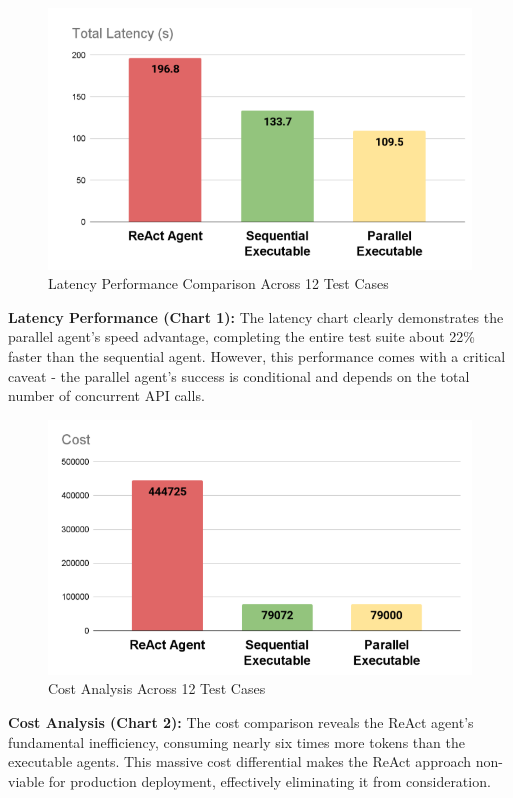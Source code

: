 \begin{spacing}{1.2}
\begin{figure}[H]
\centering
\includegraphics[scale=0.5]{images/latency.png}
\caption{Latency Performance Comparison Across 12 Test Cases}
\label{fig:latency_comparison}
\end{figure}

\textbf{Latency Performance (Chart 1):} The latency chart clearly demonstrates the parallel agent's speed advantage, completing the entire test suite about 22\% faster than the sequential agent. However, this performance comes with a critical caveat - the parallel agent's success is conditional and depends on the total number of concurrent API calls.

\begin{figure}[H]
\centering
\includegraphics[scale=0.5]{images/cost.png}
\caption{Cost Analysis Across 12 Test Cases}
\label{fig:cost_comparison}
\end{figure}

\textbf{Cost Analysis (Chart 2):} The cost comparison reveals the ReAct agent's fundamental inefficiency, consuming nearly six times more tokens than the executable agents. This massive cost differential makes the ReAct approach non-viable for production deployment, effectively eliminating it from consideration.


\end{spacing}
